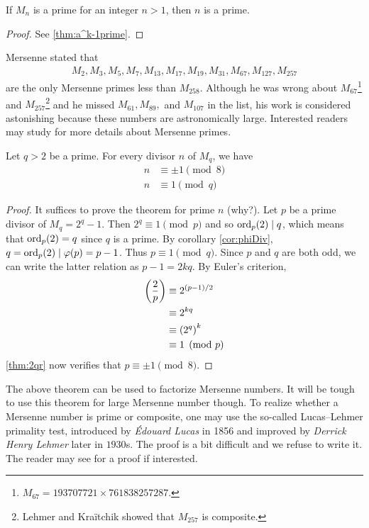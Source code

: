 \documentclass{subfiles}
\begin{document}
		\begin{proposition}
			If $M_n$ is a prime for an integer $n>1$, then $n$ is a prime.
		\end{proposition}

		\begin{proof}
			See \autoref{thm:a^k-1prime}.
		\end{proof}

	Mersenne stated that
		\begin{align*}
				M_{2}, M_{3}, M_{5}, M_{7}, M_{13},M_{17},M_{19},M_{31},M_{67},M_{127},M_{257}
		\end{align*}
	are the only Mersenne primes less than $M_{258}$. Although he was wrong about $M_{67}$\footnote{$M_{67}=193707721 \times 761838257287.$} and $M_{257}$\footnote{Lehmer and Kra\"{i}tchik showed that $M_{257}$ is composite.} and he missed $M_{61}, M_{89},$ and $M_{107}$ in the list, his work is considered astonishing because these numbers are astronomically large. Interested readers may study \textcite{ribenboim_1991} for more details about Mersenne primes.

		\begin{theorem}
				Let $q>2$ be a prime. For every divisor $n$ of $M_q$, we have
					\begin{align*}
						n &\equiv \pm 1 \pmod 8\\
						n &\equiv 1 \pmod q
					\end{align*}
		\end{theorem}

		\begin{proof}
			It suffices to prove the theorem for prime $n$ (why?). Let $p$ be a prime divisor of $M_q=2^q-1$. Then $2^q \equiv 1 \pmod p$ and so $\operatorname{ord}_p(2)\mid q$, which means that $\operatorname{ord}_p(2)=q$ since $q$ is a prime. By corollary \eqref{cor:phiDiv}, $q=\operatorname{ord}_p(2)\mid \varphi(p)=p-1$. Thus $p \equiv 1 \pmod q$. Since $p$ and $q$ are both odd, we can write the latter relation as $p-1=2kq$. By Euler's criterion,
				\begin{align*}
					\func{}{\dfrac{2}{p}} &\equiv 2^{(p-1)/2} \\
											  &\equiv 2^{kq}\\
											  &\equiv \func{}{2^q}^k\\
											  &\equiv 1 \pmod p
				\end{align*}
			\autoref{thm:2qr} now verifies that $p \equiv \pm 1 \pmod 8$.
		\end{proof}

	The above theorem can be used to factorize Mersenne numbers. It will be tough to use this theorem for large Mersenne number though. To realize whether a Mersenne number is prime or composite, one may use the so-called Lucas–Lehmer primality test, introduced by \textit{\'Edouard Lucas} in 1856 and improved by \textit{Derrick Henry Lehmer} later in $1930$s. The proof is a bit difficult and we refuse to write it. The reader may see \textcite{bruce_1993} for a proof if interested.
\end{document}
